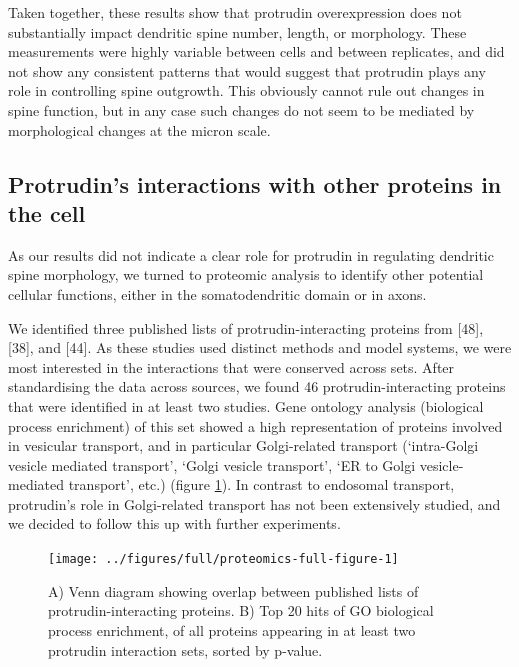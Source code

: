 \documentclass[
  12pt,
  a4paper,
]{book}
\begin{document}
Taken together, these results show that protrudin overexpression does not substantially impact dendritic spine number, length, or morphology. These measurements were highly variable between cells and between replicates, and did not show any consistent patterns that would suggest that protrudin plays any role in controlling spine outgrowth. This obviously cannot rule out changes in spine function, but in any case such changes do not seem to be mediated by morphological changes at the micron scale.

\hypertarget{GO-analysis}{%
\subsection{Protrudin's interactions with other proteins in the cell}\label{GO-analysis}}

As our results did not indicate a clear role for protrudin in regulating dendritic spine morphology, we turned to proteomic analysis to identify other potential cellular functions, either in the somatodendritic domain or in axons.

We identified three published lists of protrudin-interacting proteins from {[}48{]}, {[}38{]}, and {[}44{]}. As these studies used distinct methods and model systems, we were most interested in the interactions that were conserved across sets. After standardising the data across sources, we found 46 protrudin-interacting proteins that were identified in at least two studies. Gene ontology analysis (biological process enrichment) of this set showed a high representation of proteins involved in vesicular transport, and in particular Golgi-related transport (`intra-Golgi vesicle mediated transport', `Golgi vesicle transport', `ER to Golgi vesicle-mediated transport', etc.) (figure \ref{fig:proteomics-full-figure}). In contrast to endosomal transport, protrudin's role in Golgi-related transport has not been extensively studied, and we decided to follow this up with further experiments.

\begin{figure}
\texttt{[image: ../figures/full/proteomics-full-figure-1]} \caption[Data set comparison and gene ontology of conserved protrudin-interacting proteins]{A) Venn diagram showing overlap between published lists of protrudin-interacting proteins. B) Top 20 hits of GO biological process enrichment, of all proteins appearing in at least two protrudin interaction sets, sorted by p-value.}\label{fig:proteomics-full-figure}
\end{figure}
\end{document}
